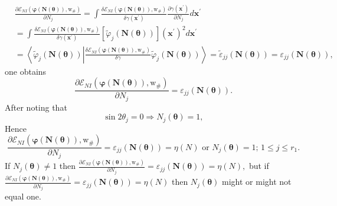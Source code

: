 \documentclass[aps,preprint]{revtex4}%
\begin{document}
\begin{align}
&  \frac{\partial\mathcal{E}_{NI}\left(  \mathbf{\varphi}\left(
\mathbf{N}\left(  \mathbf{\theta}\right)  \right)  \mathbf{,}\mathrm{w}%
_{\#}\right)  }{\partial N_{j}}=\int\frac{\delta\mathcal{E}_{NI}\left(
\mathbf{\varphi}\left(  \mathbf{N}\left(  \mathbf{\theta}\right)  \right)
\mathbf{,}\mathrm{w}_{\#}\right)  }{\delta\gamma\left(  \mathbf{x}^{\prime
}\right)  }\frac{\partial\gamma\left(  \mathbf{x}^{\prime}\right)  }{\partial
N_{j}}d\mathbf{x}^{\prime}\nonumber\\
&  =\int\frac{\delta\mathcal{E}_{NI}\left(  \mathbf{\varphi}\left(
\mathbf{N}\left(  \mathbf{\theta}\right)  \right)  \mathbf{,}\mathrm{w}%
_{\#}\right)  }{\delta\gamma\left(  \mathbf{x}^{\prime}\right)  }\left[
\tilde{\varphi}_{j}\left(  \mathbf{N}\left(  \mathbf{\theta}\right)  \right)
\right]  \left(  \mathbf{x}^{\prime}\right)  ^{2}d\mathbf{x}^{\prime
}\nonumber\\
&  =\left\langle \tilde{\varphi}_{j}\left(  \mathbf{N}\left(  \mathbf{\theta
}\right)  \right)  \left\vert \frac{\delta\mathcal{E}_{NI}\left(
\mathbf{\varphi}\left(  \mathbf{N}\left(  \mathbf{\theta}\right)  \right)
\mathbf{,}\mathrm{w}_{\#}\right)  }{\delta\gamma}\tilde{\varphi}_{j}\left(
\mathbf{N}\left(  \mathbf{\theta}\right)  \right)  \right.  \right\rangle
=\tilde{\varepsilon}_{jj}\mathbf{\left(  \mathbf{N}\left(  \mathbf{\theta
}\right)  \right)  }=\varepsilon_{jj}\mathbf{\left(  \mathbf{N}\left(
\mathbf{\theta}\right)  \right)  },
\end{align}
one obtains
\begin{equation}
\frac{\partial\mathcal{E}_{NI}\left(  \mathbf{\varphi}\left(  \mathbf{N}%
\left(  \mathbf{\theta}\right)  \right)  \mathbf{,}\mathrm{w}_{\#}\right)
}{\partial N_{j}}=\varepsilon_{jj}\mathbf{\left(  \mathbf{N}\left(
\mathbf{\theta}\right)  \right)  }.
\end{equation}
After noting that
\begin{equation}
\sin2\theta_{j}=0\Rightarrow N_{j}\left(  \mathbf{\theta}\right)  =1,
\end{equation}
Hence
\begin{equation}
\frac{\partial\mathcal{E}_{NI}\left(  \mathbf{\varphi}\left(  \mathbf{N}%
\left(  \mathbf{\theta}\right)  \right)  \mathbf{,}\mathrm{w}_{\#}\right)
}{\partial N_{j}}=\varepsilon_{jj}\mathbf{\left(  \mathbf{N}\left(
\mathbf{\theta}\right)  \right)  }=\eta\left(  N\right)  \text{ or }%
N_{j}\left(  \mathbf{\theta}\right)  =1;\,1\leq j\leq r_{1}.
\end{equation}
If $N_{j}\left(  \mathbf{\theta}\right)  \neq1$ then $\frac{\partial
\mathcal{E}_{NI}\left(  \mathbf{\varphi}\left(  \mathbf{N}\left(
\mathbf{\theta}\right)  \right)  \mathbf{,}\mathrm{w}_{\#}\right)  }{\partial
N_{j}}=\varepsilon_{jj}\mathbf{\left(  \mathbf{N}\left(  \mathbf{\theta
}\right)  \right)  }=\eta\left(  N\right)  ,$ but if $\frac{\partial
\mathcal{E}_{NI}\left(  \mathbf{\varphi}\left(  \mathbf{N}\left(
\mathbf{\theta}\right)  \right)  \mathbf{,}\mathrm{w}_{\#}\right)  }{\partial
N_{j}}=\varepsilon_{jj}\mathbf{\left(  \mathbf{N}\left(  \mathbf{\theta
}\right)  \right)  }=\eta\left(  N\right)  $ then $N_{j}\left(  \mathbf{\theta
}\right)  $ might or might not equal one.
\end{document}
